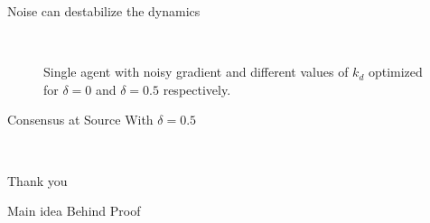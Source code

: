 \documentclass{beamer}
\begin{document}
\begin{frame}{Noise can destabilize the dynamics}
	\begin{figure}[h!]
		\centering
		\\
		\caption{Single agent with noisy gradient and different values of $k_d$ optimized for $\delta=0$ and $\delta=0.5$ respectively.}
		\label{fig:1AgentNoise}
	\end{figure}
\end{frame}
\begin{frame}{Consensus at Source With $\delta=0.5$}
\begin{figure}[h!]
	\centering
	\\
	\label{fig:MAS}
\end{figure}
\end{frame}
\begin{frame}{}
\begin{center}
    \huge{Thank you}
\end{center}
\end{frame}
\begin{frame}{Main idea Behind Proof}
\end{frame}
\end{document}
